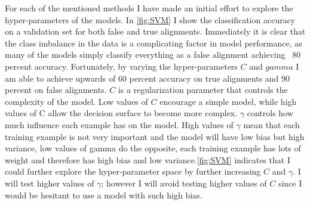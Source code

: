 \documentclass{article}
\begin{document}
For each of the mentioned methods I have made an initial effort to explore the hyper-parameters of the models. In \autoref{fig:SVM} I show the classification accuracy on a validation set for both false and true alignments. Immediately it is clear that the class imbalance in the data is a complicating factor in model performance, as many of the models simply classify everything as a false alignment achieving ~80 percent accuracy. Fortunately, by varying the hyper-parameters $C$ and $gamma$ I am able to achieve upwards of 60 percent accuracy on true alignments and 90 percent on false alignments. $C$ is a regularization parameter that controls the complexity of the model. Low values of $C$ encourage a simple model, while high values of C allow the decision surface to become more complex. $\gamma$ controls how much influence each example has on the model. High values of $\gamma$ mean that each training example is not very important and the model will have low bias but high variance, low values of gamma do the opposite, each training example has lots of weight and therefore has high bias and low variance.\autoref{fig:SVM} indicates that I could further explore the hyper-parameter space by further increasing $C$ and $\gamma$. I will test higher values of $\gamma$; however I will avoid testing higher values of $C$ since I would be hesitant to use a model with such high bias. 
\end{document}
